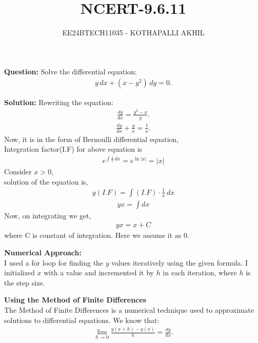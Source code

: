 \documentclass[article]{IEEEtran}
\numberwithin{figure}{enumi}
\begin{document}

\title{NCERT-9.6.11}
\author{EE24BTECH11035 - KOTHAPALLI AKHIL}
{\let\newpage\relax\maketitle}

\noindent\textbf{Question: }  
Solve the differential equation:  
\begin{align}
    y \, dx + (x - y^2) \, dy = 0.
\end{align}

\noindent\textbf{Solution:}  
Rewriting the equation:  
\begin{align}
    \frac{dy}{dx} = \frac{y^2 - x}{y}.
\end{align}
\begin{align}
    \frac{dy}{dx}+\frac{y}{x}=\frac{1}{x}.
\end{align}
Now, it is in the form of Bernoulli differential equation,\\
Integration factor(I.F) for above equation is
\begin{align}
  e^{\int \frac{1}{x} \, dx} = e^{\ln |x|}=|x|
\end{align}
Consider $x>0$, \\
solution of the equation is,
\begin{align}
    y(I.F)=\int{(I.F) \cdot \frac{1}{x} \, dx}
\end{align}
\begin{align}
    yx=\int{dx}
\end{align}
Now, on integrating we get,\\
\begin{align}
    yx=x+C
\end{align}
where C is constant of integration. Here we assume it as 0.\\
\vspace{0.5em}  

\noindent\textbf{Numerical Approach:}\\ 
I used a for loop for finding the $y$ values iteratively using the given formula. I initialized $x$ with a value and incremented it by $h$ in each iteration, where $h$ is the step size.  

\textbf{Using the Method of Finite Differences}\\ 
The Method of Finite Differences is a numerical technique used to approximate solutions to differential equations.  
We know that:  
\begin{align}
    \lim_{h \to 0} \frac{y(x+h) - y(x)}{h} = \frac{dy}{dx}.
\end{align}
\end{document}
